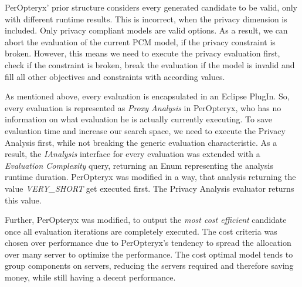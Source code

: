 PerOpteryx' prior structure considers every generated candidate to be valid, only with different runtime results. This is incorrect, when the privacy dimension is included. Only privacy compliant models are valid options. As a result, we can abort the evaluation of the current PCM model, if the privacy constraint is broken. However, this means we need to execute the privacy evaluation first, check if the constraint is broken, break the evaluation if the model is invalid and fill all other objectives and constraints with according values.

As mentioned above, every evaluation is encapsulated in an Eclipse PlugIn. So, every evaluation is represented as \textit{Proxy Analysis} in PerOpteryx, who has no information on what evaluation he is actually currently executing. To save evaluation time and increase our search space, we need to execute the Privacy Analysis first, while not breaking the generic evaluation characteristic. As a result, the \textit{IAnalysis} interface for every evaluation was extended with a \textit{Evaluation Complexity} query, returning an Enum representing the analysis runtime duration. PerOpteryx was modified in a way, that analysis returning the value \textit{VERY\_SHORT} get executed first. The Privacy Analysis evaluator returns this value.

Further, PerOpteryx was modified, to output the \textit{most cost efficient} candidate once all evaluation iterations are completely executed. The cost criteria was chosen over performance due to PerOpteryx's tendency to spread the allocation over many server to optimize the performance. The cost optimal model tends to group components on servers, reducing the servers required and therefore saving money, while still having a decent performance.


 

